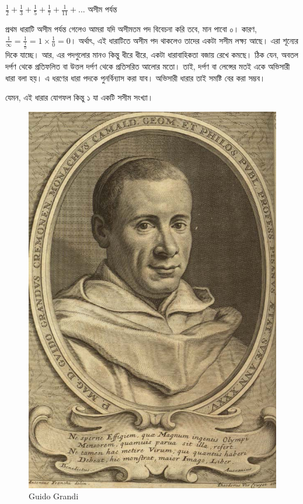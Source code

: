 \documentclass[
]{book}
\begin{document}
\(\frac 1 2 + \frac 1 3 + \frac 1 5 + \frac 1 7 + \frac 1 {11} + ...\) অসীম পর্যন্ত

প্রথম ধারাটি অসীম পর্যন্ত গেলেও আমরা যদি অসীমতম পদ বিবেচনা করি তবে, মান পাবো ০। কারণ, \(\frac{1}{\infty}=\frac 1 {\frac{1}{0}}=1 \times \frac{1}{0}=0\)। অর্থাৎ, এই ধারাটিতে অসীম পদ থাকলেও তাদের একটা সসীম লক্ষ্য আছে। এরা শূন্যের দিকে যাচ্ছে। আর, এর পদগুলোর মানও কিন্তু ধীরে ধীরে, একটা ধারাবাহিকতা বজায় রেখে কমছে। ঠিক যেন, অবতল দর্পণ থেকে প্রতিফলিত বা উত্তল দর্পণ থেকে প্রতিসরিত আলোর মতো। তাই, দর্পণ বা লেন্সের মতই একে অভিসারী ধারা বলা হয়। এ ধরণের ধারা পদকে পুনর্বিন্যাস করা যাব। অভিসারী ধারার তাই সমষ্টি বের করা সম্ভব।

যেমন, এই ধারার যোগফল কিন্তু ১ যা একটি সসীম সংখ্যা।

\begin{figure}

{\centering \includegraphics[width=0.8\linewidth]{img/grandi} 

}

\caption{Guido Grandi}\label{fig:grandi}
\end{figure}
\end{document}
